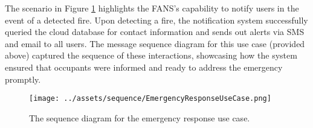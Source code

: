 The scenario in Figure \ref{fig:emergency-resp} highlights the FANS’s capability to notify users in the event of a
detected fire. Upon detecting a fire, the notification system successfully queried the cloud database for contact
information and sends out alerts via SMS and email to all users. The message sequence diagram for this use case
(provided above) captured the sequence of these interactions, showcasing how the system ensured that occupants were
informed and ready to address the emergency promptly.

\begin{figure}
    \centering
    \texttt{[image: ../assets/sequence/EmergencyResponseUseCase.png]}
    \caption{The sequence diagram for the emergency response use case.}
    \label{fig:emergency-resp}
\end{figure}
